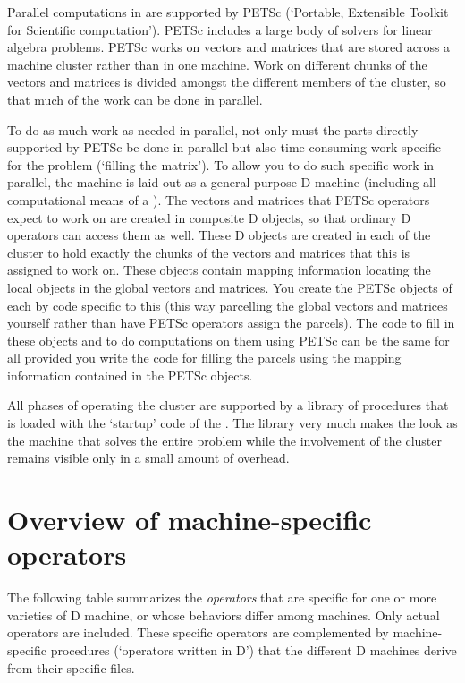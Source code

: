 Parallel computations in  are supported by PETSc
(`Portable, Extensible Toolkit for Scientific computation'). PETSc
includes a large body of solvers for linear algebra problems. PETSc
works on vectors and matrices that are stored across a machine cluster
rather than in one machine. Work on different chunks of the vectors
and matrices is divided amongst the different members of the cluster,
so that much of the work can be done in parallel.

To do as much work as needed in parallel, not only must the parts
directly supported by PETSc be done in parallel but also
time-consuming work specific for the problem (`filling the
matrix'). To allow you to do such specific work in parallel, the
 machine is laid out as a general purpose D machine
(including all computational means of a ). The vectors and
matrices that PETSc operators expect to work on are created in
composite D objects, so that ordinary D operators can access them as
well. These D objects are created in each  of the cluster
to hold exactly the chunks of the vectors and matrices that this
 is assigned to work on. These objects contain mapping
information locating the local objects in the global vectors and
matrices. You create the PETSc objects of each  by code
specific to this  (this way parcelling the global vectors
and matrices yourself rather than have PETSc operators assign the
parcels). The code to fill in these objects and to do computations on
them using PETSc can be the same for all  provided you
write the code for filling the parcels using the mapping information
contained in the PETSc objects.

All phases of operating the  cluster are supported by a
library of procedures that is loaded with the `startup' code of the
. The library very much makes the  look as the
machine that solves the entire problem while the involvement of the
 cluster remains visible only in a small amount of
overhead.



\newpage

\section{Overview of machine-specific operators}

The following table summarizes the \emph{operators} that are specific
for one or more varieties of D machine, or whose behaviors differ
among machines. Only actual operators are included. These specific
operators are complemented by machine-specific procedures (`operators
written in D') that the different D machines derive from their
specific  files.

